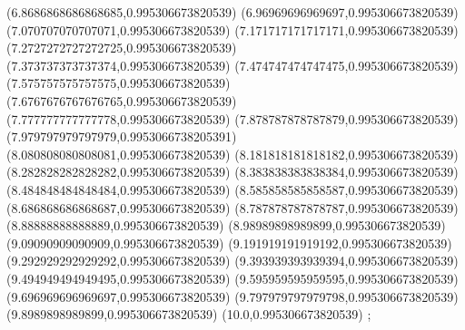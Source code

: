 {(6.8686868686868685,0.995306673820539)
(6.96969696969697,0.995306673820539)
(7.070707070707071,0.995306673820539)
(7.171717171717171,0.995306673820539)
(7.2727272727272725,0.995306673820539)
(7.373737373737374,0.995306673820539)
(7.474747474747475,0.995306673820539)
(7.575757575757575,0.995306673820539)
(7.6767676767676765,0.995306673820539)
(7.777777777777778,0.995306673820539)
(7.878787878787879,0.995306673820539)
(7.979797979797979,0.9953066738205391)
(8.080808080808081,0.995306673820539)
(8.181818181818182,0.995306673820539)
(8.282828282828282,0.995306673820539)
(8.383838383838384,0.995306673820539)
(8.484848484848484,0.995306673820539)
(8.585858585858587,0.995306673820539)
(8.686868686868687,0.995306673820539)
(8.787878787878787,0.995306673820539)
(8.88888888888889,0.995306673820539)
(8.98989898989899,0.995306673820539)
(9.09090909090909,0.995306673820539)
(9.191919191919192,0.995306673820539)
(9.292929292929292,0.995306673820539)
(9.393939393939394,0.995306673820539)
(9.494949494949495,0.995306673820539)
(9.595959595959595,0.995306673820539)
(9.696969696969697,0.995306673820539)
(9.797979797979798,0.995306673820539)
(9.8989898989899,0.995306673820539)
(10.0,0.995306673820539)
};
